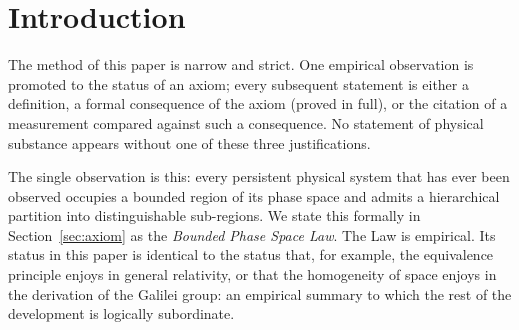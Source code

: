 
\section{Introduction}
\label{sec:intro}

The method of this paper is narrow and strict. One empirical observation is promoted to the status of an axiom; every subsequent statement is either a definition, a formal consequence of the axiom (proved in full), or the citation of a measurement compared against such a consequence. No statement of physical substance appears without one of these three justifications.

The single observation is this: every persistent physical system that has ever been observed occupies a bounded region of its phase space and admits a hierarchical partition into distinguishable sub-regions. We state this formally in Section~\ref{sec:axiom} as the \emph{Bounded Phase Space Law}. The Law is empirical. Its status in this paper is identical to the status that, for example, the equivalence principle enjoys in general relativity, or that the homogeneity of space enjoys in the derivation of the Galilei group: an empirical summary to which the rest of the development is logically subordinate.

